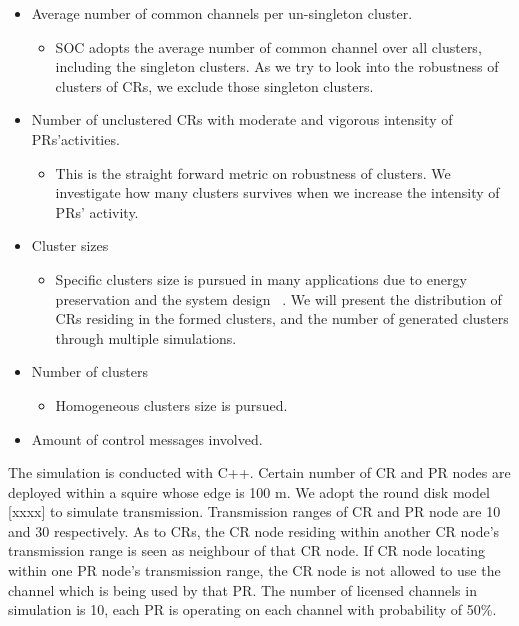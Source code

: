\begin{itemize}
\item Average number of common channels per un-singleton cluster. 
\begin{itemize}
\item SOC adopts the average number of common channel over all clusters, \ie including the singleton clusters. As we try to look into the robustness of clusters of CRs, we exclude those singleton clusters.
\end{itemize}  

\item Number of unclustered CRs with moderate and vigorous intensity of PRs'activities.
\begin{itemize}
\item This is the straight forward metric on robustness of clusters.
We investigate how many clusters survives when we increase the intensity of PRs' activity.
\end{itemize}

\item Cluster sizes 
\begin{itemize}
\item Specific clusters size is pursued in many applications due to energy preservation and the system design ~\cite{clustering_globecom11}.
We will present the distribution of CRs residing in the formed clusters, and the number of generated clusters through multiple simulations.
\end{itemize}

\item Number of clusters	
\begin{itemize}
\item Homogeneous clusters size is pursued.
\end{itemize}

\item Amount of control messages involved.
\end{itemize}

The simulation is conducted with C++. 
Certain number of CR and PR nodes are deployed within a squire whose edge is 100 m.
We adopt the round disk model [xxxx] to simulate transmission.
Transmission ranges of CR and PR node are 10 and 30 respectively.
As to CRs, the CR node residing within another CR node's transmission range is seen as neighbour of that CR node.
If CR node locating within one PR node's transmission range, the CR node is not allowed to use the channel which is being used by that PR.
The number of licensed channels in simulation is 10, each PR is operating on each channel with probability of 50\%.

